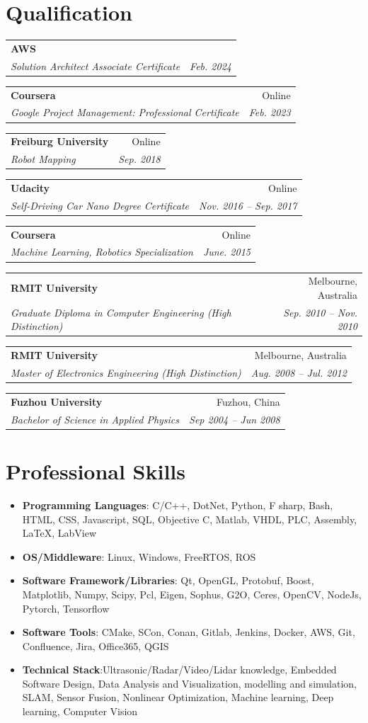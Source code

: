 \documentclass[letterpaper,11pt]{article}
\makeatletter
\newcommand{\resumeItemNoBullet}[4]{
  \vspace{-1pt}
    \begin{tabular*}{0.97\textwidth}{l@{\extracolsep{\fill}}r}
      \textbf{#1} & #2 \\
      \textit{\small#3} & \textit{\small #4} \\
    \end{tabular*}\vspace{-7pt}
}
\newcommand{\resumeSubHeadingListStart}{\begin{itemize}[leftmargin=*]}
\newcommand{\resumeSubHeadingListEnd}{\end{itemize}}
\makeatother
\begin{document}
\section{Qualification}
\resumeItemNoBullet
    {AWS}{}
    {Solution Architect Associate Certificate}{Feb. 2024}
\vspace{10pt}
\resumeItemNoBullet
    {Coursera}{Online}
    {Google Project Management: Professional Certificate}{Feb. 2023}
\vspace{10pt}
\resumeItemNoBullet
    {Freiburg University}{Online}
    {Robot Mapping}{Sep. 2018}
\vspace{10pt}
\resumeItemNoBullet
    {Udacity}{Online}
    {Self-Driving Car Nano Degree Certificate}{Nov. 2016 -- Sep. 2017}
\vspace{10pt}
\resumeItemNoBullet
    {Coursera}{Online}
    {Machine Learning, Robotics Specialization}{June. 2015}
\vspace{10pt}
\resumeItemNoBullet
    {RMIT University}{Melbourne, Australia}
    {Graduate Diploma in Computer Engineering (High Distinction)}{Sep. 2010 -- Nov. 2010}
\vspace{10pt}
\resumeItemNoBullet
    {RMIT University}{Melbourne, Australia}
    {Master of Electronics Engineering (High Distinction)}{Aug. 2008 -- Jul. 2012}
\vspace{10pt}
\resumeItemNoBullet
    {Fuzhou University}{Fuzhou, China}
    {Bachelor of Science in Applied Physics}{Sep 2004 -- Jun 2008}

\section{Professional Skills}
  \resumeSubHeadingListStart
    \item{
      \textbf{Programming Languages}{: C/C++, DotNet, Python, F sharp, Bash, HTML, CSS, Javascript, SQL, Objective C, Matlab, VHDL, PLC, Assembly, \LaTeX, LabView}
	}
    \item{
      \textbf{OS/Middleware}{: Linux, Windows, FreeRTOS, ROS}
  }

    \item{
      \textbf{Software Framework/Libraries}{: Qt, OpenGL, Protobuf, Boost, Matplotlib, Numpy, Scipy, Pcl, Eigen, Sophus, G2O, Ceres, OpenCV, NodeJs, Pytorch, Tensorflow}
  }
    \item{
      \textbf{Software Tools}{: CMake, SCon, Conan, Gitlab, Jenkins, Docker, AWS, Git, Confluence, Jira, Office365, QGIS}
  }

  \item{
      \textbf{Technical Stack}{:Ultrasonic/Radar/Video/Lidar knowledge, Embedded Software Design, Data Analysis and Visualization, modelling and simulation, SLAM, Sensor Fusion, Nonlinear Optimization, Machine learning, Deep learning, Computer Vision}
  }

  \resumeSubHeadingListEnd

\end{document}
